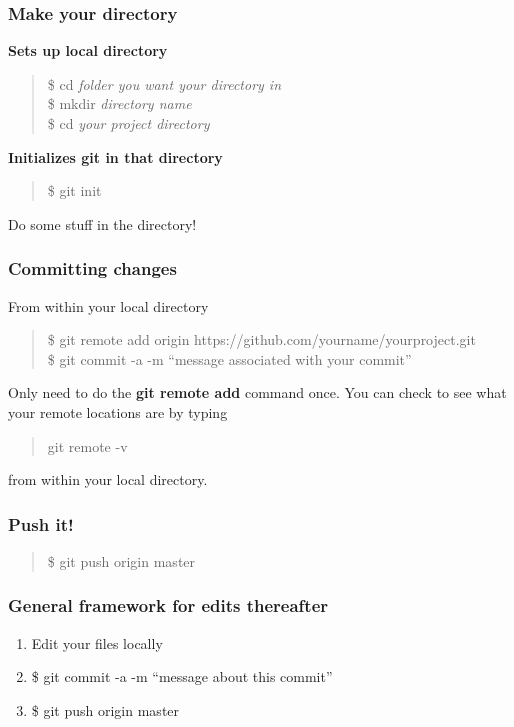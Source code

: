 \documentclass{beamer}\usepackage{graphicx, color}
\begin{document}
\begin{frame}
 \frametitle{\textbf{Make your directory}}
\textbf{Sets up local directory} \\
\begin{quote}
  \$ cd \textit{folder you want your directory in} \\
\$ mkdir \textit{directory name} \\
\$ cd \textit{your project directory} \\
\end{quote}

\textbf{Initializes git in that directory}
\begin{quote}
 \$ git init
\end{quote}
Do some stuff in the directory!
\end{frame}



\begin{frame}
\frametitle{\textbf{Committing changes}}
  From within your local directory
  \begin{quote}
    \$ git remote add origin https://github.com/yourname/yourproject.git \\
    \$ git commit -a -m ``message associated with your commit''
  \end{quote}
  \pause
  Only need to do the \textbf{git remote add} command once. You can check to see what your remote locations are by typing \begin{quote}
                                                                                                                           git remote -v
                                                                                                                          \end{quote}
from within your local directory. 
\end{frame}


\begin{frame}
\frametitle{\textbf{Push it!}}
 \begin{quote}
  \$ git push origin master
 \end{quote}

\end{frame}



\begin{frame}
 \frametitle{General framework for edits thereafter}
\begin{block}{}
 \begin{enumerate}
  \item Edit your files locally
  \item \$ git commit -a -m ``message about this commit''
  \item \$ git push origin master 
 \end{enumerate}
\end{block}
\end{frame}
\end{document}
